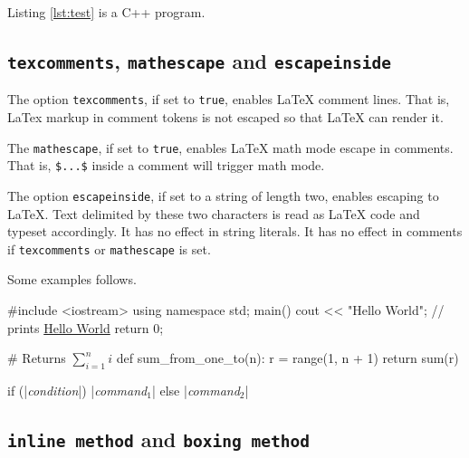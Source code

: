 \documentclass[10pt,a4paper]{article}
\begin{document}
\begin{Example}
  Listing \ref{lst:test} is a C++ program.
\end{Example}

\subsection{\texttt{texcomments}, \texttt{mathescape} and \texttt{escapeinside}}

The option \verb|texcomments|, if set to \texttt{true}, enables \LaTeX{}
comment lines. That is, LaTex markup in comment tokens is not escaped
so that \LaTeX{} can render it.

The \verb|mathescape|, if set to \texttt{true}, enables \LaTeX{} math
mode escape in comments. That is, \verb|$...$| inside a comment will
trigger math mode.

The option \verb|escapeinside|, if set to a string of length two,
enables escaping to \LaTeX{}. Text delimited by these two characters
is read as \LaTeX{} code and typeset accordingly. It has no effect in
string literals. It has no effect in comments if \verb|texcomments| or
\verb|mathescape| is set.

Some examples follows.

\begin{Example}
\begin{pygmented}[lang=c++,texcomments]
#include <iostream>
using namespace std;
main()
{
   cout << "Hello World";  // prints \underline{Hello World}
   return 0;
}
\end{pygmented}
\end{Example}

\begin{Example}
\begin{pygmented}[lang=python,mathescape]
# Returns $\sum_{i=1}^{n}i$
def sum_from_one_to(n):
    r = range(1, n + 1)
    return sum(r)
\end{pygmented}
\end{Example}

\begin{Example}
\begin{pygmented}[lang=c,escapeinside=||]

if (|\textit{condition}|)
    |\textit{command$_1$}|
else
    |\textit{command$_2$}|
\end{pygmented}
\end{Example}


\subsection{\texttt{inline method} and \texttt{boxing method}}
\end{document}
